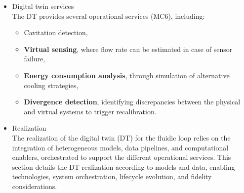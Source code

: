 \documentclass[
]{article}
\providecommand{\tightlist}{%
  \setlength{\itemsep}{0pt}\setlength{\parskip}{0pt}}
\begin{document}
\begin{itemize}
\begin{itemize}
\begin{itemize}
      \begin{itemize}
      \tightlist
      \item
        System under study and physical components\\
        The system under study is the fluidic loop itself (MC1),
        composed of physical actuators (MC2) and sensing components
        (MC3). The actuators include the regulation valve and the
        cooling unit, while the sensing layer captures variables such as
        inlet/outlet pressures, pump speed, and temperature.
      \item
        Physical - virtual interactions\\
        Sensor data are continuously collected and transmitted to the
        digital environment through a data infrastructure (data lake),
        forming the \textbf{physical-to-virtual interface} (MC4).
        Conversely, the \textbf{virtual-to-physical interaction} (MC5)
        enables the DT to influence the physical system through actuator
        commands, such as adjusting valve opening or managing cooling
        strategies.
      \item
        Digital twin services
      \end{itemize}
    \item
      Digital twin services\\
      The DT provides several operational services (MC6), including:

      \begin{itemize}
      \tightlist
      \item
        Cavitation detection,
      \item
        \textbf{Virtual sensing}, where flow rate can be estimated in
        case of sensor failure,
      \item
        \textbf{Energy consumption analysis}, through simulation of
        alternative cooling strategies,
      \item
        \textbf{Divergence detection}, identifying discrepancies between
        the physical and virtual systems to trigger recalibration.
      \end{itemize}
    \item
      Realization\\
      The realization of the digital twin (DT) for the fluidic loop
      relies on the integration of heterogeneous models, data pipelines,
      and computational enablers, orchestrated to support the different
      operational services. This section details the DT realization
      according to models and data, enabling technologies, system
      orchestration, lifecycle evolution, and fidelity considerations.


\end{itemize}
\end{itemize}
\end{itemize}
\end{document}
